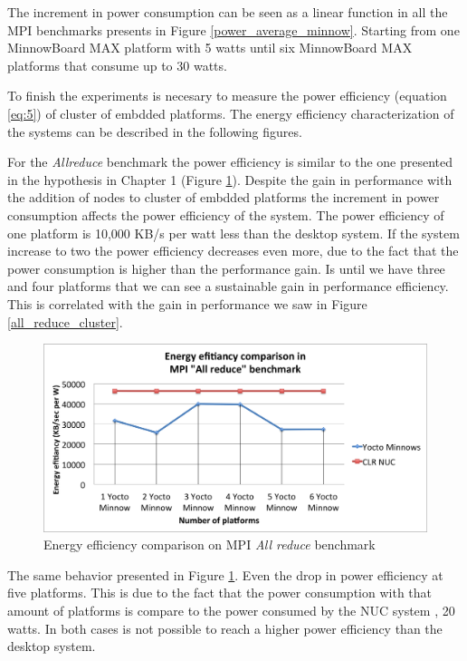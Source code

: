 The increment in power consumption can be seen as a linear function in all the
MPI benchmarks presents in Figure \ref {power_average_minnow}. Starting from
one MinnowBoard MAX platform with 5 watts until six MinnowBoard MAX platforms
that consume up to 30 watts. 

To finish the experiments is necesary to measure the power efficiency 
(equation \ref{eq:5}) of cluster of embdded platforms. The energy efficiency 
characterization of the systems can be described in the
following figures.

For the \textit{Allreduce} benchmark the power efficiency is similar to the one
presented in the hypothesis in Chapter 1 (Figure \ref{all_reduce_energy}).
Despite the gain in performance with the addition of nodes to cluster of embdded
platforms the increment in power consumption affects the power efficiency of the
system.  The power efficiency of one platform is 10,000 KB/s per watt less than
the desktop system. If the system increase to two the power efficiency
decreases even more, due to the fact that the power consumption is higher than the
performance gain.  Is until we have three and four platforms that we can see a
sustainable gain in performance efficiency. This is correlated with the gain in
performance we saw in Figure \ref{all_reduce_cluster}. 


\begin{figure}[H]
\centering
\includegraphics[width=1 \textwidth]{images/energy_results/allreduce.png}
\caption{Energy efficiency comparison on MPI \textit{All reduce} benchmark}
\label{all_reduce_energy}
\end{figure}

The same behavior presented in Figure \ref{all_reduce_energy}. Even the drop in
power efficiency at five platforms. This is due to the fact that the power
consumption with that amount of platforms is compare to the power consumed by
the NUC system \cite{NUC}, 20 watts.  In both cases is not possible to reach a
higher power efficiency than the desktop system. 

